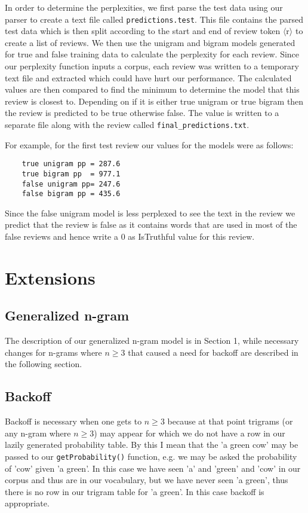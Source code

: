 \documentclass{article}
\begin{document}
In order to determine the perplexities, we first parse the test data using our parser to create a text file called \texttt{predictions.test}. This file contains the parsed test data which is then split according to the start and end of review token $\langle$r$\rangle$ to create a list of reviews. We then use the unigram and bigram models generated for true and false training data to calculate the perplexity for each review. Since our perplexity function inputs a corpus, each review was written to a temporary text file and extracted which could have hurt our performance. The calculated values are then compared to find the minimum to determine the model that this review is closest to. Depending on if it is either true unigram or true bigram then the review is predicted to be true otherwise false. The value is written to a separate file along with the review called \texttt{final\_predictions.txt}.\par

For example, for the first test review our values for the models were as follows:
{\small\begin{verbatim}
    true unigram pp = 287.6
    true bigram pp  = 977.1
    false unigram pp= 247.6
    false bigram pp = 435.6
\end{verbatim}}

Since the false unigram model is less perplexed to see the text in the review we predict that the review is false as it contains words that are used in most of the false reviews and hence write a 0 as IsTruthful value for this review.

\section{Extensions}

\subsection{Generalized n-gram}

The description of our generalized n-gram model is in Section 1, while necessary changes for n-grams where $n\geq3$ that caused a need for backoff are described in the following section.


\subsection{Backoff}

Backoff is necessary when one gets to $n \geq 3$ because at that point trigrams (or any n-gram where $n \geq 3$) may appear for which we do not have a row in our lazily generated probability table. By this I mean that the 'a green cow' may be passed to our \texttt{getProbability()} function, e.g. we may be asked the probability of 'cow' given 'a green'. In this case we have seen 'a' and 'green' and 'cow' in our corpus and thus are in our vocabulary, but we have never seen 'a green', thus there is no row in our trigram table for 'a green'. In this case backoff is appropriate. 
\end{document}
